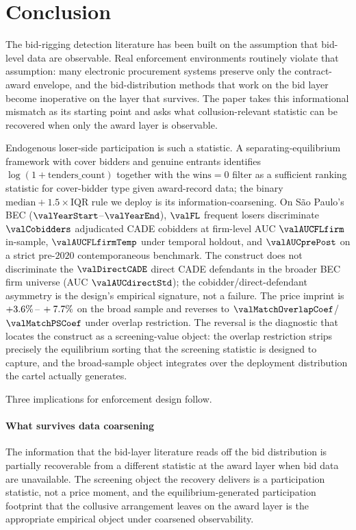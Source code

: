 \section{Conclusion}
\label{sec:conclusion}

The bid-rigging detection literature has been built on the
assumption that bid-level data are observable. Real enforcement
environments routinely violate that assumption: many electronic
procurement systems preserve only the contract-award envelope,
and the bid-distribution methods that work on the bid layer
become inoperative on the layer that survives. The paper takes
this informational mismatch as its starting point and asks what
collusion-relevant statistic can be recovered when only the
award layer is observable.

Endogenous loser-side participation is such a statistic. A
separating-equilibrium framework with cover bidders and genuine
entrants identifies $\log(1+\text{tenders\_count})$ together
with the $\text{wins}=0$ filter as a sufficient ranking
statistic for cover-bidder type given award-record data; the
binary $\text{median}+1.5\!\times\!\text{IQR}$ rule we deploy
is its information-coarsening. On São Paulo's BEC
($\valYearStart$--$\valYearEnd$), $\valFL$ frequent losers
discriminate $\valCobidders$ adjudicated CADE cobidders at
firm-level AUC $\valAUCFLfirm$ in-sample,
$\valAUCFLfirmTemp$ under temporal holdout, and
$\valAUCprePost$ on a strict pre-$2020$ contemporaneous
benchmark. The construct does not discriminate the
$\valDirectCADE$ direct CADE defendants in the broader BEC firm
universe (AUC $\valAUCdirectStd$); the cobidder/direct-defendant
asymmetry is the design's empirical signature, not a failure.
The price imprint is $+3.6\%\,\text{--}\,+7.7\%$ on the broad sample
and reverses to $\valMatchOverlapCoef$/$\valMatchPSCoef$ under
overlap restriction. The reversal is the diagnostic that
locates the construct as a screening-value object: the
overlap restriction strips precisely the equilibrium sorting
that the screening statistic is designed to capture, and the
broad-sample object integrates over the deployment distribution
the cartel actually generates.

Three implications for enforcement design follow.

\paragraph{What survives data coarsening} The information that
the bid-layer literature reads off the bid distribution is
partially recoverable from a different statistic at the award
layer when bid data are unavailable. The screening object the
recovery delivers is a participation statistic, not a price
moment, and the equilibrium-generated participation footprint
that the collusive arrangement leaves on the award layer is the
appropriate empirical object under coarsened observability.

